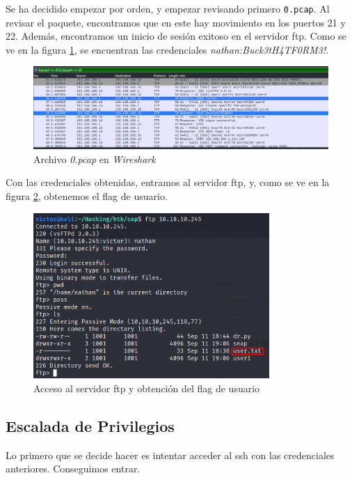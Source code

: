 Se ha decidido empezar por orden, y empezar revisando primero \texttt{0.pcap}. Al revisar el paquete, encontramos que en este hay movimiento en los puertos 21 y 22. Además, encontramos un inicio de sesión exitoso en el servidor \acrshort{ftp}. Como se ve en la figura \ref{fig:cap-wire-0}, se encuentran las credenciales \textit{nathan:Buck3tH4TF0RM3!}.
\begin{figure}[h]
    \centering
    \includegraphics[width=1.0\textwidth]{images/machines/cap/wireshark-0.png}
    \caption{Archivo \textit{0.pcap} en \textit{Wireshark}}
    \label{fig:cap-wire-0}
\end{figure}

Con las credenciales obtenidas, entramos al servidor \acrshort{ftp}, y, como se ve en la figura \ref{fig:cap-user-flag}, obtenemos el flag de usuario.
\begin{figure}[h]
    \centering
    \includegraphics[width=0.8\textwidth]{images/machines/cap/user-flag.png}
    \caption{Acceso al servidor \acrshort{ftp} y obtención del flag de usuario}
    \label{fig:cap-user-flag}
\end{figure}

\subsection{Escalada de Privilegios}

Lo primero que se decide hacer es intentar acceder al \acrshort{ssh} con las credenciales anteriores. Conseguimos entrar.\\

